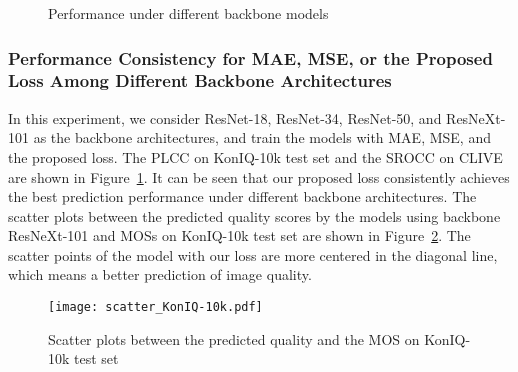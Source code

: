\documentclass[sigconf]{acmart}
\begin{document}
\begin{figure}[!htb]
    \centering
    \hfill
    \caption{Performance under different backbone models}
    \label{fig:backbone}
\end{figure}

\subsubsection{Performance Consistency for MAE, MSE, or the Proposed Loss Among Different Backbone Architectures} 
\label{sec:4.3.4}
In this experiment, we consider ResNet-18, ResNet-34, ResNet-50, and ResNeXt-101 as the backbone architectures, and train the models with MAE, MSE, and the proposed loss. 
The PLCC on KonIQ-10k test set and the SROCC on CLIVE are shown in Figure~\ref{fig:backbone}.
It can be seen that our proposed loss consistently achieves the best prediction performance under different backbone architectures.
The scatter plots between the predicted quality scores by the models using backbone ResNeXt-101 and MOSs on KonIQ-10k test set are shown in Figure~\ref{fig:scatters}.
The scatter points of the model with our loss are more centered in the diagonal line, which means a better prediction of image quality.

\begin{figure}[!htb]
    \centering
    \texttt{[image: scatter\_KonIQ-10k.pdf]}
    \caption{Scatter plots between the predicted quality and the MOS on KonIQ-10k test set}
    \label{fig:scatters}
\end{figure}
\end{document}

